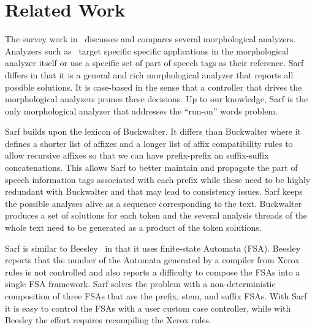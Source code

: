 \documentclass[11pt,letterpaper]{article}
\begin{document}




\section{Related Work }
\label{sec:related}

The survey work in~\cite{Sughaiyer:04} discusses and compares
several morphological analyzers. 
Analyzers such as~\cite{Khoja:01,Darwish:02} 
target specific specific applications in the morphological 
analyzer itself or use a specific set of part of speech tags
as their reference.
Sarf differs in that it is a general and rich morphological 
analyzer that reports all possible solutions. 
It is case-based in the sense that a controller that drives
the morphological analyzers prunes these decisions. 
Up to our knowledge, Sarf is the only morphological analyzer
that addresses the ``run-on'' words problem. 

Sarf builds upon the lexicon of Buckwalter.
It differs than Buckwalter where it defines a shorter list of affixes
and a longer list of affix compatibility rules to allow recursive 
affixes so that we can have prefix-prefix an suffix-suffix 
concatenations.
This allows Sarf to better maintain and propagate 
the part of speech information
tags associated with each prefix while these need to be highly 
redundant with Buckwalter and that may lead to consistency issues. 
Sarf keeps the possible analyses alive as a sequence corresponding
to the text. Buckwalter produces a set of solutions for each token 
and the several analysis threads of the whole text need to be 
generated as a product of the token solutions. 

Sarf is similar to Beesley~ in that it uses
finite-state Automata (FSA). 
Beesley reports that the number of the Automata generated by a compiler
from Xerox rules is not controlled and also reports a difficulty to 
compose the FSAs into a single FSA framework. 
Sarf solves the problem with a non-deterministic composition of three
FSAs that are the prefix, stem, and suffix FSAs. 
With Sarf it is easy to control the FSAs with a user custom case 
controller, while with Beesley the effort requires recompiling the
Xerox rules.
\end{document}
